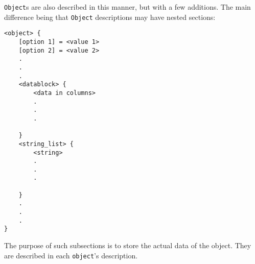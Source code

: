 {\tt Object}s are also described in this manner, but with a few additions.  
The main difference being that {\tt Object} descriptions may have nested
sections:
\begin{verbatim}
<object> {
    [option 1] = <value 1>
    [option 2] = <value 2>
    .
    .
    .
    <datablock> {
        <data in columns>
        .
        .
        .
        
    }
    <string_list> {
        <string>
        .
        .
        .
        
    }
    .
    .
    .
}
\end{verbatim}
The purpose of such subsections is to store the actual data of the object.  They
are described in each {\tt object}'s description.
